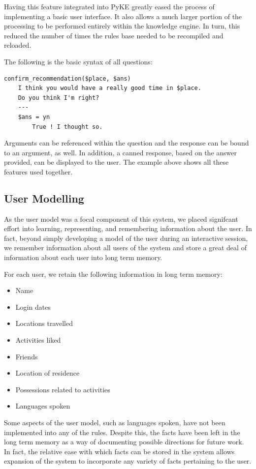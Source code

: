 \documentclass[11pt]{article} %
\begin{document}
Having this feature integrated into PyKE greatly eased the process of implementing a basic user interface. It also allows a much larger portion of the processing to be performed entirely within the knowledge engine. In turn, this reduced the number of times the rules base needed to be recompiled and reloaded.

The following is the basic syntax of all questions:
\begin{Verbatim}[xleftmargin=2.5cm]
confirm_recommendation($place, $ans)
    I think you would have a really good time in $place.
    Do you think I'm right?
    ---
    $ans = yn
        True ! I thought so.
\end{Verbatim}

Arguments can be referenced within the question and the response can be bound to an argument, as well. In addition, a canned response, based on the answer provided, can be displayed to the user. The example above shows all these features used together.

\subsection{User Modelling}

As the user model was a focal component of this system, we placed signifcant effort into learning, representing, and remembering information about the user. In fact, beyond simply developing a model of the user during an interactive session, we remember information about all users of the system and store a great deal of information about each user into long term memory.

For each user, we retain the following information in long term memory:
\begin{multicols}{2}
\begin{itemize}
\setlength\itemsep{0em}
\item Name
\item Login dates
\item Locations travelled
\item Activities liked
\item Friends
\item Location of residence
\item Possessions related to activities
\item Languages spoken
\end{itemize}
\end{multicols}

Some aspects of the user model, such as languages spoken, have not been implemented into any of the rules. Despite this, the facts have been left in the long term memory as a way of documenting possible directions for future work. In fact, the relative ease with which facts can be stored in the system allows expansion of the system to incorporate any variety of facts pertaining to the user.
\end{document}
